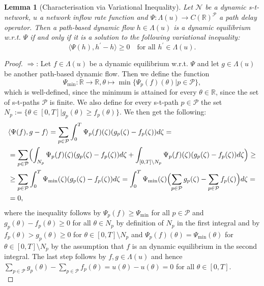 \documentclass[reqno,openany]{amsbook}
\theoremstyle{definition}
\theoremstyle{plain}
\newtheorem{lemma}[definition]{Lemma}
\begin{document}
\begin{lemma}[Characterisation via Variational Inequality]\label{lemma: CharacterisationViaVI}
Let $\mathcal{N}$ be a dynamic s-t-network, $u$ a network inflow rate function and $\Psi: \Lambda(u) \to C(\mathbb{R})^{\mathcal{P}}$ a path delay operator. Then a path-based dynamic flow $h \in \Lambda(u)$ is a dynamic equilibrium w.r.t. $\Psi$ if and only if it is a solution to the following variational inequality:
\begin{equation}\tag{VI}\label{eq: VI}
	\langle \Psi(h), h^{\prime} - h \rangle \geq 0 \quad \text{for all $h^{\prime} \in \Lambda(u)$}.
\end{equation}
\end{lemma}

\begin{proof}
$\Rightarrow$: Let $f \in \Lambda(u)$ be a dynamic equilibrium w.r.t. $\Psi$ and let $g \in \Lambda(u)$ be another path-based dynamic flow. Then we define the function 
\[\Psi_{\min}: \mathbb{R} \to \mathbb{R}, \theta \mapsto \min\{\Psi_p(f)(\theta) \vert p \in \mathcal{P}\},\] 
which is well-defined, since the minimum is attained for every $\theta \in \mathbb{R}$, since the set of s-t-paths $\mathcal{P}$ is finite. We also define for every s-t-path $p \in \mathcal{P}$ the set $N_p := \{ \theta \in [0, T] \vert g_p(\theta) \geq f_p(\theta) \}$. We then get the following:
\begin{align*}
	\begin{split}
		&\langle \Psi(f), g - f \rangle = \sum_{p \in \mathcal{P}} \int_0^T \Psi_p(f)(\zeta)(g_p(\zeta) - f_p(\zeta)) d\zeta =\\
		&= \sum_{p \in \mathcal{P}} \Bigl(\int_{N_p} \Psi_p(f)(\zeta)(g_p(\zeta) - f_p(\zeta)) d\zeta + 
		\int_{[0, T]\setminus N_p} \Psi_p(f)(\zeta)(g_p(\zeta) - f_p(\zeta)) d\zeta \Bigr) \geq \\
		&\geq \sum_{p \in \mathcal{P}} \int_0^T \Psi_{\min}(\zeta)(g_p(\zeta) - f_p(\zeta)) d\zeta = \int_0^T \Psi_{\min}(\zeta)
		\Bigl(\sum_{p \in \mathcal{P}} g_p(\zeta) - \sum_{p \in \mathcal{P}} f_p(\zeta)\Bigr) d\zeta =\\
		&= 0,
	\end{split}
\end{align*}
where the inequality follows by $\Psi_p(f) \geq \Psi_{\min}$ for all $p \in \mathcal{P}$ and $g_p(\theta) - f_p(\theta) \geq 0$ for all $\theta \in N_p$ by definition of $N_p$ in the first integral and by $f_p(\theta) > g_p(\theta) \geq 0$ for $\theta \in [0, T]\setminus N_p$ and $\Psi_p(f)(\theta) = \Psi_{\min}(\theta)$ for $\theta \in [0, T]\setminus N_p$ by the assumption that $f$ is an dynamic equilibrium in the second integral. The last step follows by $f, g \in \Lambda(u)$ and hence $\sum_{p \in \mathcal{P}} g_p(\theta) - \sum_{p \in \mathcal{P}} f_p(\theta) = u(\theta) - u(\theta) = 0$ for all $\theta \in [0, T]$.\\

\end{proof}
\end{document}
